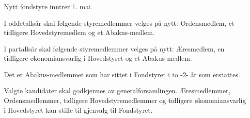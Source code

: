 \subsubsection{}
Nytt fondstyre inntrer 1. mai.

I oddetallsår skal følgende styremedlemmer velges på nytt: Ordensmedlem, et tidligere
Hovedstyremedlem og et Abakus-medlem.

I partallsår skal følgende styremedlemmer velges på nytt: Æresmedlem, en tidligere
økonomiansvarlig i Hovedstyret og et Abakus-medlem.

Det er Abakus-medlemmet som har sittet i Fondstyret i to -2- år som erstattes.

Valgte kandidater skal godkjennes av generalforsamlingen. Æresmedlemmer, Ordensmedlemmer,
tidligere Hovedstyremedlemmer og tidligere økonomiansvarlig i Hovedstyret kan
stille til gjenvalg til Fondstyret.
